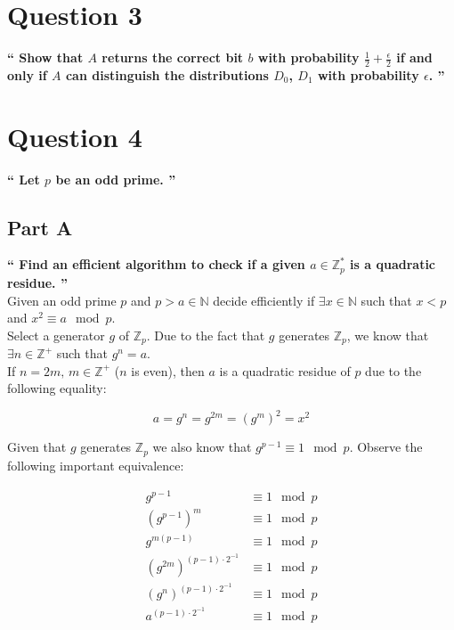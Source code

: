 \documentclass{article}
\newcommand{\HomeworkText}[1]{\textbf{``#1''}\\}
\begin{document}
	\clearpage
	\section*{Question 3}
	\HomeworkText{
		Show that $A$ returns the correct bit $b$ with probability $\frac{1}{2} + \frac{\epsilon}{2}$ if and only if $A$ can distinguish the distributions $D_0$, $D_1$ with probability $\epsilon$.
	}
	

	\clearpage
	\section*{Question 4}
	\HomeworkText{
		Let $p$ be an odd prime.
	}
	\subsection*{Part A}
	\HomeworkText{
		Find an efficient algorithm to check if a given $a \in \mathbb{Z}^{*}_{p}$ is a quadratic residue.
	}

	Given an odd prime $p$ and $p > a \in \mathbb{N}$ decide efficiently if $\exists x \in  \mathbb{N}$ such that $x < p$ and $x^2 \equiv a \mod p$.\\
	
	Select a generator $g$ of $\mathbb{Z}_p$.
	Due to the fact that $g$ generates $\mathbb{Z}_p$, we know that $\exists n \in \mathbb{Z}^{+}$ such that $g^n = a$. \\
	If $n = 2m,\, m \in \mathbb{Z}^{+}$ ($n$ is even), then $a$ is a quadratic residue of $p$ due to the following equality:
	
	$$a = g^{n} = g^{2m} = (g^m)^2 = x^2$$
	
	Given that $g$ generates $\mathbb{Z}_p$ we also know that $g^{p-1} \equiv 1 \mod p$. Observe the following important equivalence:
	
	\begin{equation}
	\begin{split}
	g^{p-1} & \equiv 1 \mod p\\
	(g^{p-1})^m & \equiv 1 \mod p\\
	g^{m(p-1)} & \equiv 1 \mod p\\
	(g^{2m})^{(p-1)\cdot2^{-1}} & \equiv 1 \mod p\\
	(g^n)^{(p-1)\cdot2^{-1}} & \equiv 1 \mod p\\
	a^{(p-1)\cdot2^{-1}} & \equiv 1 \mod p\\
	\end{split}
	\end{equation}
	
\end{document}
